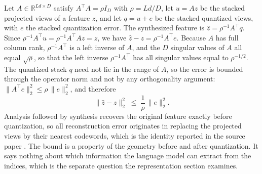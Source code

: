 \documentclass[11pt]{article}
\theoremstyle{remark}
\begin{document}
Let $A \in \mathbb{R}^{Ld \times D}$ satisfy $A^{\top}A = \rho I_D$ with $\rho = Ld/D$, let $u = Az$ be the stacked projected views of a feature $z$, and let $q = u + e$ be the stacked quantized views, with $e$ the stacked quantization error. The synthesized feature is $\hat z = \rho^{-1}A^{\top}q$. Since $\rho^{-1}A^{\top}u = \rho^{-1}A^{\top}Az = z$, we have $\hat z - z = \rho^{-1}A^{\top}e$. Because $A$ has full column rank, $\rho^{-1}A^{\top}$ is a left inverse of $A$, and the $D$ singular values of $A$ all equal $\sqrt{\rho}$, so that the left inverse $\rho^{-1}A^{\top}$ has all singular values equal to $\rho^{-1/2}$. The quantized stack $q$ need not lie in the range of $A$, so the error is bounded through the operator norm and not by any orthogonality argument: $\lVert A^{\top}e\rVert_2^2 \le \rho\,\lVert e\rVert_2^2$, and therefore
\begin{equation}
\lVert \hat z - z\rVert_2^2 \;\le\; \frac{1}{\rho}\,\lVert e\rVert_2^2 .
\end{equation}
Analysis followed by synthesis recovers the original feature exactly before quantization, so all reconstruction error originates in replacing the projected views by their nearest codewords, which is the identity reported in the source paper \cite{zou2026}. The bound is a property of the geometry before and after quantization. It says nothing about which information the language model can extract from the indices, which is the separate question the representation section examines.
\end{document}
